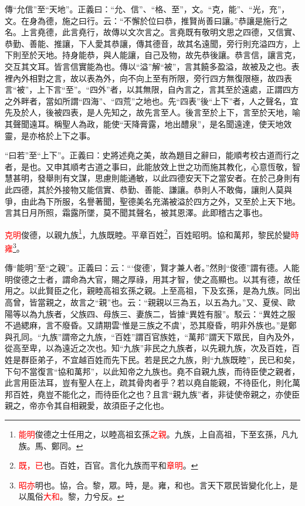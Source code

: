 {\noindent\zhuan{}\fzbyks 傳“允信”至“天地”。正義曰：“允、信”、“格、至”，文。“克，能”、“光，充”，文。在身為德，施之曰行。云：“不懈於位曰恭，推賢尚善曰讓。”恭讓是施行之名。上言堯德，此言堯行，故傳以文次言之。言堯既有敬明文思之四德，又信實、恭勤、善能、推讓，下人愛其恭讓，傳其德音，故其名遠聞，旁行則充溢四方，上下則至於天地。持身能恭，與人能讓，自己及物，故先恭後讓。恭言信，讓言克，交互其文耳。皆言信實能為也。傳以“溢”解“被”，言其饒多盈溢，故被及之也。表裡內外相對之言，故以表為外，向不向上至有所限，旁行四方無復限極，故四表言“被”，上下言“至”。“四外”者，以其無限，自內言之，言其至於遠處，正謂四方之外畔者，當如所謂“四海”、“四荒”之地也。先“四表”後“上下”者，人之聲名，宜先及於人，後被四表，是人先知之，故先言至人。後言至於上下，言至於天地，喻其聲聞遠耳。稱聖人為政，能使“天降膏露，地出醴泉”，是名聞遠達，使天地效靈，是亦格於上下之事。 \par}

{\noindent\shu{}\fzkt “曰若”至“上下”。正義曰：史將述堯之美，故為題目之辭曰，能順考校古道而行之者，是也。又申其順考古道之事曰，此能放效上世之功而施其教化，心意恆敬，智慧甚明，發舉則有文謀，思慮則能通敏，以此四德安天下之當安者。在於己身則有此四德，其於外接物又能信實、恭勤、善能、謙讓。恭則人不敢侮，讓則人莫與爭，由此為下所服，名譽著聞，聖德美名充滿被溢於四方之外，又至於上天下地。言其日月所照，霜露所墜，莫不聞其聲名，被其恩澤。此即稽古之事也。 \par}


\textcolor{red}{克明}俊德，以親九族\footnote{\textcolor{red}{能明}俊德之士任用之，以睦高祖玄孫\textcolor{red}{之親}。九族，上自高祖，下至玄孫，凡九族。馬、鄭同。}，九族既睦。平章百姓\footnote{\textcolor{red}{既，已}也。百姓，百官。言化九族而平和\textcolor{red}{章明}。}，百姓昭明。協和萬邦，黎民於變\textcolor{red}{時雍}\footnote{\textcolor{red}{昭亦}明也。協，合。黎，眾。時，是。雍，和也。言天下眾民皆變化化上，是以風俗\textcolor{red}{大和}。黎，力兮反。}。

{\noindent\zhuan{}\fzbyks 傳“能明”至“之親”。正義曰：云：“‘俊德’，賢才兼人者。”然則“俊德”謂有德。人能明俊德之士者，謂命為大官，賜之厚祿，用其才智，使之高顯也。以其有德，故任用之。以此賢臣之化，親睦高祖玄孫之親。上至高祖，下及玄孫，是為九族。同出高曾，皆當親之，故言之“親”也。云：“親親以三為五，以五為九。”又、夏侯、歐陽等以為九族者，父族四、母族三、妻族二，皆據“異姓有服”。駁云：“異姓之服不過緦麻，言不廢昏。又請期雲‘惟是三族之不虞’，恐其廢昏，明非外族也。”是鄭與孔同。“九族”謂帝之九族，“百姓”謂百官族姓，“萬邦”謂天下眾民，自內及外，從高至卑，以為遠近之次也。知“九族”非民之九族者，以先親九族，次及百姓，百姓是群臣弟子，不宜越百姓而先下民。若是民之九族，則“九族既睦”，民已和矣，下句不當復言“協和萬邦”，以此知帝之九族也。堯不自親九族，而待臣使之親者，此言用臣法耳，豈有聖人在上，疏其骨肉者乎？若以堯自能親，不待臣化，則化萬邦百姓，堯豈不能化之，而待臣化之也？且言“親九族”者，非徒使帝親之，亦使臣親之，帝亦令其自相親愛，故須臣子之化也。 \par}

